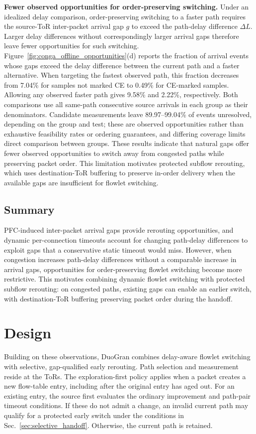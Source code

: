 \documentclass[10pt,journal,compsoc]{IEEEtran}
\begin{document}
\noindent
\textbf{Fewer observed opportunities for order-preserving switching.}
Under an idealized delay comparison, order-preserving switching to a faster path requires the source-ToR inter-packet arrival gap $g$ to exceed the path-delay difference $\Delta L$. Larger delay differences without correspondingly larger arrival gaps therefore leave fewer opportunities for such switching. Figure~\ref{fig:conga_offline_opportunities}(d) reports the fraction of arrival events whose gaps exceed the delay difference between the current path and a faster alternative. When targeting the fastest observed path, this fraction decreases from 7.04\% for samples not marked CE to 0.49\% for CE-marked samples. Allowing any observed faster path gives 9.58\% and 2.22\%, respectively. Both comparisons use all same-path consecutive source arrivals in each group as their denominators. Candidate measurements leave 89.97--99.04\% of events unresolved, depending on the group and test; these are observed opportunities rather than exhaustive feasibility rates or ordering guarantees, and differing coverage limits direct comparison between groups. These results indicate that natural gaps offer fewer observed opportunities to switch away from congested paths while preserving packet order. This limitation motivates protected subflow rerouting, which uses destination-ToR buffering to preserve in-order delivery when the available gaps are insufficient for flowlet switching.

\subsection{Summary}
PFC-induced inter-packet arrival gaps provide rerouting opportunities, and dynamic per-connection timeouts account for changing path-delay differences to exploit gaps that a conservative static timeout would miss. However, when congestion increases path-delay differences without a comparable increase in arrival gaps, opportunities for order-preserving flowlet switching become more restrictive. This motivates combining dynamic flowlet switching with protected subflow rerouting: on congested paths, existing gaps can enable an earlier switch, with destination-ToR buffering preserving packet order during the handoff.

\section{Design}
Building on these observations, DuoGran combines delay-aware flowlet switching with selective, gap-qualified early rerouting. Path selection and measurement reside at the ToRs. The exploration-first policy applies when a packet creates a new flow-table entry, including after the original entry has aged out. For an existing entry, the source first evaluates the ordinary improvement and path-pair timeout conditions. If these do not admit a change, an invalid current path may qualify for a protected early switch under the conditions in Sec.~\ref{sec:selective_handoff}. Otherwise, the current path is retained.
\end{document}
